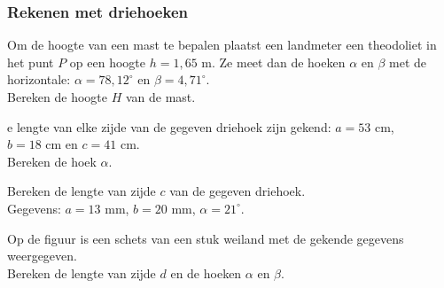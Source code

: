 \subsubsection{Rekenen met driehoeken}

\begin{oef}
Om de hoogte van een mast te bepalen plaatst een landmeter een theodoliet in het punt $P$ op een hoogte $h=1,65$ m. Ze meet dan de hoeken $\alpha$ en $\beta$ met de horizontale: $\alpha=78,12^\circ$ en $\beta=4,71^\circ$.\\
Bereken de hoogte $H$ van de mast.


\begin{figure}[H]
	\centering 
	 
\end{figure}

 
\end{oef}

\begin{oef}
e lengte van elke zijde van de gegeven driehoek zijn gekend: $a=53$ cm, \\ $b=18$ cm en $c=41$ cm.\\
Bereken de hoek $\alpha$.


\begin{figure}[H]
	\centering 
	 
\end{figure}
 

\end{oef}

\begin{oef}
Bereken de lengte van zijde $c$ van de gegeven driehoek.\\
Gegevens: $a=13$ mm, $b=20$ mm, $\alpha=21^\circ$. 

\begin{figure}[H]
	\centering 
	 
\end{figure}


\end{oef}

\begin{oef}
	Op de figuur is een schets van een stuk weiland met de gekende gegevens weergegeven. \\
	Bereken de lengte van zijde $d$ en de hoeken $\alpha$ en $\beta$.


\begin{figure}[H]
	\centering 
	 
\end{figure}




\end{oef}


